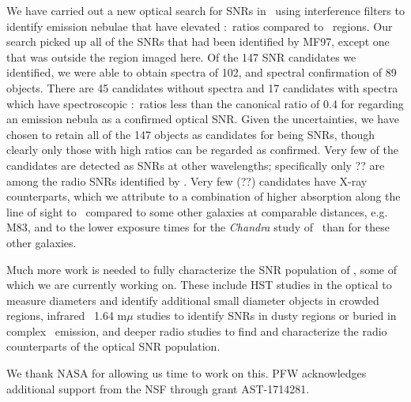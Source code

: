 We have carried out a new optical search for SNRs in \gal\ using interference filters to identify emission nebulae that have elevated \sii:\ha\ ratios compared to \hii\ regions.  Our search picked up all of the SNRs that had been identified by MF97, except one that was outside the region imaged here. Of the 147 SNR candidates we identified, we were able to obtain spectra of 102, and spectral confirmation of 89 objects.  There are 45 candidates  without spectra and 17 candidates with spectra which have spectroscopic \sii:\ha\ ratios less than the canonical ratio of 0.4 for regarding an emission nebula as a confirmed optical SNR.  Given the uncertainties, we have chosen to retain all of the 147 objects as candidates for being SNRs, though clearly only those with high ratios can be regarded as confirmed.  Very few of the candidates are detected as SNRs at other wavelengths; specifically only ?? are among the radio SNRs identified by \cite{lacey01}.  Very few (??) candidates have X-ray counterparts, which we attribute to a combination of higher absorption along the line of sight to \gal\ compared to some other galaxies at comparable distances, e.g. M83, and to the %
lower exposure times for the {\em Chandra} study of \gal\ than for these other galaxies. 

Much more work is needed to fully characterize the SNR population of \gal, some of which we are currently working on.  These include HST studies in the optical to measure diameters and identify additional small diameter objects in crowded regions, infrared \feii\ 1.64 m$\mu$ studies to identify SNRs in dusty regions or buried in complex \ha\ emission, and deeper radio studies to find and characterize the radio counterparts of the optical SNR population. 

\acknowledgments

We thank NASA for allowing us time to work on this.  PFW acknowledges additional support from the NSF through grant AST-1714281.


\pagebreak





\clearpage




\startlongtable

\clearpage


